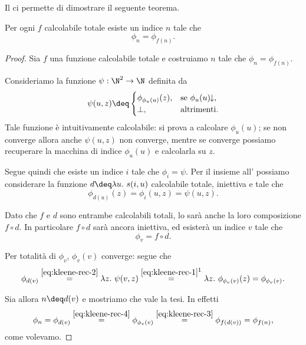 Il  ci permette di dimostrare il seguente teorema.

\begin{theorem}
    Per ogni $f$ calcolabile totale esiste un indice $n$ tale che \[
        \phi_n = \phi_{f(n)}.
    \]
\end{theorem}
\begin{proof}
    Sia $f$ una funzione calcolabile totale e costruiamo $n$ tale che $\phi_n = \phi_{f(n)}$.

    Consideriamo la funzione $\psi : \N^2 \to \N$ definita da \begin{equation}\label{eq:kleene-rec-1}
        \psi(u, z) \deq \begin{cases}
            \phi_{\phi_u(u)}(z), &\text{se } \phi_{u}(u)\conv,\\
            \bot, &\text{altrimenti.}
        \end{cases}
    \end{equation} Tale funzione è intuitivamente calcolabile: si prova a calcolare $\phi_u(u)$; se non converge allora anche $\psi(u, z)$ non converge, mentre se converge possiamo recuperare la macchina di indice $\phi_u(u)$ e calcolarla su $z$.
    
    Segue quindi che esiste un indice $i$ tale che $\phi_i = \psi$. Per il  insieme all' possiamo considerare la funzione $d \deq \lam{u}{s(i, u)}$ calcolabile totale, iniettiva e tale che \begin{equation}\label{eq:kleene-rec-2}
        \phi_{d(u)}(z) = \phi_i(u, z) = \psi(u, z).
    \end{equation}

    Dato che $f$ e $d$ sono entrambe calcolabili totali, lo sarà anche la loro composizione $f \circ d$. In particolare $f \circ d$ sarà ancora iniettiva, ed esisterà un indice $v$ tale che \begin{equation}\label{eq:kleene-rec-3}
        \phi_v = f \circ d.
    \end{equation}

    Per totalità di $\phi_v$, $\phi_v(v)$ converge: segue che \begin{equation}\label{eq:kleene-rec-4}
        \phi_{d(v)} 
            \stackrel{\eqref{eq:kleene-rec-2}}{=} \lam{z}{\psi(v,z)} 
            \stackrel{\eqref{eq:kleene-rec-1}\footnotemark}{=} \lam{z}{\phi_{\phi_v(v)}(z)}
            = \phi_{\phi_v(v)}.
    \end{equation}
    
    Sia allora $n \deq d(v)$ e mostriamo che vale la tesi. In effetti \[
        \phi_n 
            = \phi_{d(v)} 
            \stackrel{\eqref{eq:kleene-rec-4}}{=} \phi_{\phi_v(v)}
            \stackrel{\eqref{eq:kleene-rec-3}}{=} \phi_{f(d(v))}
            = \phi_{f(n)},
    \] come volevamo.
\end{proof}